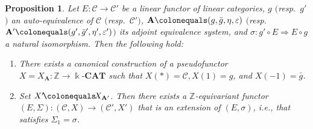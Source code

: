 \documentclass{surv-l}
\numberwithin{equation}{chapter}
\numberwithin{figure}{chapter}
\theoremstyle{plain}
\newtheorem{prp}[thm]{Proposition}
\theoremstyle{definition}
\theoremstyle{remark}
\newcommand{\kCAT}{\Bbbk\text{-}\mathbf{CAT}}
\begin{document}
\begin{prp}\label{prp:pseudo-action}\label{prop:5.4.15}
Let $E \colon {\mathcal{C}} \to {\mathcal{C}}'$ be a linear functor of linear categories,
$g$ $($resp.\ $g'$$)$ an auto-equivalence of ${\mathcal{C}}$ $($resp.\ ${\mathcal{C}}'$$)$,
$\mathbf{A}\colonequals (g, \bar{g}, \eta, \varepsilon)$ $($resp.\ $\mathbf{A}'\colonequals (g', \bar{g}', \eta', \varepsilon')$$)$
its adjoint equivalence system, and
$\sigma \colon g'\circ E \Rightarrow E \circ g$ a natural isomorphism.
Then the following hold:
\begin{enumerate}
\item
There exists a canonical construction of a pseudofunctor
$X = X_\mathbf{A} \colon \mathbb{Z} \to \kCAT$
such that $X(*) = {\mathcal{C}}, X(1) = g$, and $X(-1) = \bar{g}$.
\item
Set $X'\!\colonequals\!  X_{\mathbf{A}'}$.
Then there exists a $\mathbb{Z}$-equivariant functor $(E, \Sigma) \colon ({\mathcal{C}}, X)\! \to ({\mathcal{C}}', X')$
that is an extension of $(E, \sigma)$, i.e., that satisfies $\Sigma_1 = \sigma$.
\end{enumerate}
\end{prp}
\end{document}
